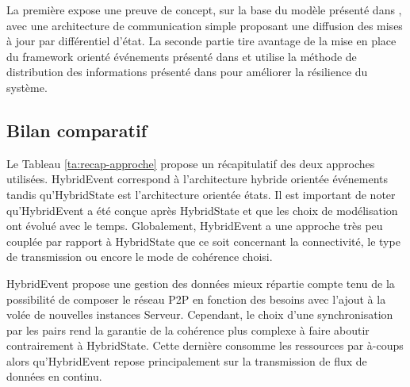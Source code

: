 La première expose une preuve de concept, sur la base du modèle présenté dans 
\cite{Desprat2015a}, avec une architecture de communication simple proposant 
une diffusion des mises à jour par différentiel d'état. La seconde partie 
tire avantage de la mise en place du \gls{framework} orienté événements présenté 
dans \cite{Desprat2016} et utilise la méthode de distribution des informations 
présenté dans \cite{Desprat2017} pour améliorer la résilience du système. 







\subsection{Bilan comparatif}
Le Tableau \ref{ta:recap-approche} propose un récapitulatif des deux approches 
utilisées. HybridEvent correspond à l'architecture hybride \og orientée 
événements\fg{} tandis qu'HybridState est l'architecture \og orientée états\fg{}.
Il est important de noter qu'HybridEvent a été conçue après HybridState et que les 
choix de modélisation ont évolué avec le temps. Globalement, HybridEvent a une 
approche très peu couplée par rapport à HybridState que ce soit concernant la 
connectivité, le type de transmission ou encore le mode de cohérence choisi.

HybridEvent propose une gestion des données mieux répartie compte tenu de la 
possibilité de \og composer\fg{} le réseau \gls{P2P} en fonction des besoins avec 
l'ajout à la volée de nouvelles instances Serveur. Cependant, le choix d'une 
synchronisation par les pairs rend la garantie de la cohérence plus complexe à 
faire aboutir contrairement à HybridState. Cette dernière consomme les 
ressources par à-coups alors qu'HybridEvent repose principalement sur la 
transmission de flux de données en continu.



